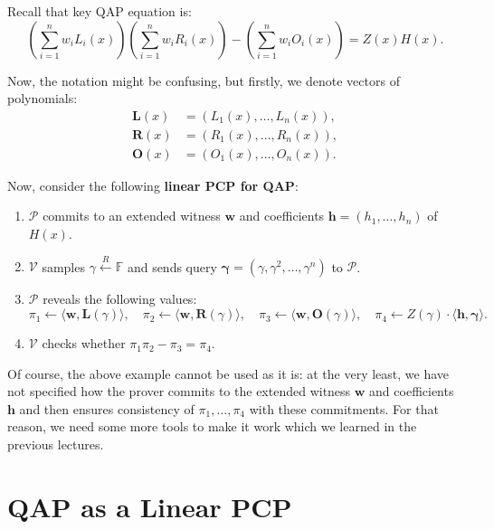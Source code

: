 \documentclass[../lecture-notes.tex]{subfiles}
\begin{document}
\begin{example}
    Recall that key QAP equation is:
    \begin{equation*}
        \left(\sum_{i=1}^nw_iL_i(x)\right)\left(\sum_{i=1}^nw_iR_i(x)\right) - \left(\sum_{i=1}^nw_iO_i(x)\right) = Z(x)H(x).
    \end{equation*}

    Now, the notation might be confusing, but firstly, we denote vectors of polynomials: 
    \begin{align*}
        \boldsymbol{L}(x) & = (L_1(x),\dots,L_n(x)), \\
        \boldsymbol{R}(x) & = (R_1(x),\dots,R_n(x)), \\
        \boldsymbol{O}(x) & = (O_1(x),\dots,O_n(x)).
    \end{align*}
    
    Now, consider the following \textbf{linear PCP for QAP}:
    \begin{enumerate}
        \item $\mathcal{P}$ commits to an extended witness $\mathbf{w}$ and coefficients $\mathbf{h} = (h_1,\dots,h_n)$ of $H(x)$.
        \item $\mathcal{V}$ samples $\gamma \xleftarrow{R} \mathbb{F}$ and sends query $\boldsymbol{\gamma} = (\gamma,\gamma^2,\dots,\gamma^n)$ to $\mathcal{P}$.
        \item $\mathcal{P}$ reveals the following values:
        \begin{equation*}
            \pi_1 \gets \langle \mathbf{w}, \boldsymbol{L}(\gamma) \rangle, \quad \pi_2 \gets \langle \mathbf{w}, \boldsymbol{R}(\gamma) \rangle, \quad \pi_3 \gets \langle \mathbf{w}, \boldsymbol{O}(\gamma) \rangle, \quad \pi_4 \gets Z(\gamma) \cdot \langle \mathbf{h}, \boldsymbol{\gamma} \rangle.
        \end{equation*}
        \item $\mathcal{V}$ checks whether $\pi_1\pi_2 - \pi_3 = \pi_4$.
    \end{enumerate}
\end{example}

Of course, the above example cannot be used as it is: at the very least, we have not specified how the prover commits to the extended witness $\mathbf{w}$ and coefficients $\mathbf{h}$ and then ensures consistency of $\pi_1,\dots,\pi_4$ with these commitments. For that reason, we need some more tools to make it work which we learned in the previous lectures.

\section{QAP as a Linear PCP}
\end{document}
